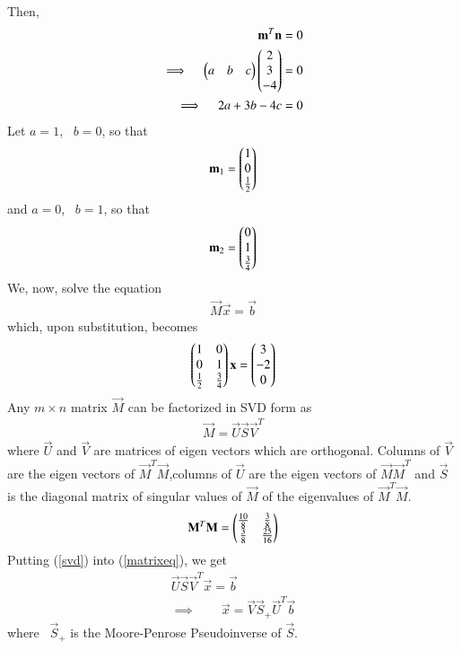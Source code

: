 \documentclass[journal,12pt,twocolumn]{IEEEtran}
\begin{document}
Then, 
\begin{align}
	\vec{m}^T\vec{n} = 0 \\
	\implies \quad \myvec{a & b & c}\myvec{2\\ 3\\-4} = 0   \label{mTn} \\
	\implies \quad 2a + 3b -4c = 0 
\end{align}
Let $a=1$, \ $b=0$, so that
\begin{align}
	\mathbf{m}_1 = \begin{pmatrix}1 \\ 0 \\ \frac{1}{2}\end{pmatrix} 
\end{align}
and $a=0$, \ $b=1$, so that
\begin{align}
	\mathbf{m}_2 = \begin{pmatrix}0 \\ 1 \\ \frac{3}{4}\end{pmatrix} 
\end{align}
We, now, solve the equation
\begin{align}
	\vec{M}\vec{x} = \vec{b} 	\label{matrixeq}
\end{align}
which, upon substitution, becomes
\begin{align}
\begin{pmatrix}1 & 0\\ 0 & 1 \\ \frac{1}{2} & \frac{3}{4}\end{pmatrix}\mathbf{x}=\begin{pmatrix}3 \\ -2 \\ 0\end{pmatrix} 
\end{align}
	Any $m\times n$ matrix $\vec{M}$ can be factorized in SVD form as
\begin{align}
	\vec{M} = \vec{U}\vec{S}\vec{V}^T	\label{svd}
\end{align}
where $\vec{U}$ and $\vec{V}$ are matrices of eigen vectors which are orthogonal. Columns of $\vec{V}$ are the eigen vectors of $\vec{M}^T\vec{M}$,columns of $\vec{U}$ are the eigen vectors of $\vec{M}\vec{M}^T$ and $\vec{S}$ is the diagonal matrix of singular values of $\vec{M}$ of the eigenvalues of $\vec{M}^T\vec{M}$.
\begin{align}
	\mathbf{M}^T\mathbf{M} = 
	\begin{pmatrix}\frac{10}{8} & \frac{3}{8} \\ \frac{3}{8} & \frac{25}{16} \end{pmatrix}
\end{align}
Putting (\ref{svd}) into (\ref{matrixeq}), we get
\begin{align}
	\vec{U}\vec{S} \vec{V}^T\vec{x} = \vec{b} \\
    \implies \qquad \vec{x} = \vec{V}\vec{S}_{+}\vec{U}^T\vec{b} \label{calcx}
\end{align}
where \ $\vec{S}_{+}$ is the Moore-Penrose Pseudoinverse of $\vec{S}$.
\end{document}
